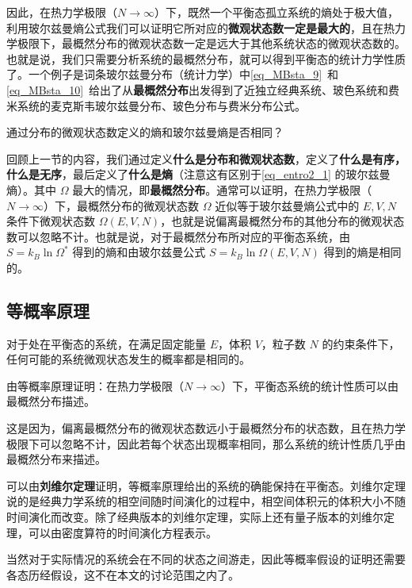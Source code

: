 因此，在热力学极限（$N\rightarrow \infty$）下，既然一个平衡态孤立系统的熵处于极大值，利用玻尔兹曼熵公式我们可以证明它所对应的\textbf{微观状态数一定是最大的}，且在热力学极限下，最概然分布的微观状态数一定是远大于其他系统状态的微观状态数的。也就是说，我们只需要分析系统的最概然分布，就可以得到平衡态的统计力学性质了。一个例子是词条玻尔兹曼分布（统计力学）中\autoref{eq_MBsta_9}~和\autoref{eq_MBsta_10}~给出了从\textbf{最概然分布}出发得到了近独立经典系统、玻色系统和费米系统的麦克斯韦玻尔兹曼分布、玻色分布与费米分布公式。
\begin{exercise}{}
通过分布的微观状态数定义的熵和玻尔兹曼熵是否相同？
\end{exercise}
回顾上一节的内容，我们通过定义\textbf{什么是分布和微观状态数}，定义了\textbf{什么是有序，什么是无序}，最后定义了\textbf{什么是熵}（注意这有区别于\autoref{eq_entro2_1} 的玻尔兹曼熵）。其中 $\Omega$ 最大的情况，即\textbf{最概然分布}。通常可以证明，在热力学极限（$N\rightarrow \infty$）下，最概然分布的微观状态数 $\Omega$ 近似等于玻尔兹曼熵公式中的 $E,V,N$ 条件下微观状态数 $\Omega(E,V,N)$，也就是说偏离最概然分布的其他分布的微观状态数可以忽略不计。也就是说，对于最概然分布所对应的平衡态系统，由 $S=k_B\ln \Omega^*$ 得到的熵和由玻尔兹曼公式 $S=k_B\ln \Omega(E,V,N)$ 得到的熵是相同的。

\subsection{等概率原理}
对于处在平衡态的系统，在满足固定能量 $E$，体积 $V$，粒子数 $N$ 的约束条件下，任何可能的系统微观状态发生的概率都是相同的。
\begin{exercise}{}
由等概率原理证明：在热力学极限（$N\rightarrow \infty$）下，平衡态系统的统计性质可以由最概然分布描述。
\end{exercise}
这是因为，偏离最概然分布的微观状态数远小于最概然分布的状态数，且在热力学极限下可以忽略不计，因此若每个状态出现概率相同，那么系统的统计性质几乎由最概然分布来描述。

可以由\textbf{刘维尔定理}证明，等概率原理给出的系统的确能保持在平衡态。刘维尔定理说的是经典力学系统的相空间随时间演化的过程中，相空间体积元的体积大小不随时间演化而改变。除了经典版本的刘维尔定理，实际上还有量子版本的刘维尔定理，可以由密度算符的时间演化方程表示。

当然对于实际情况的系统会在不同的状态之间游走，因此等概率假设的证明还需要各态历经假设，这不在本文的讨论范围之内了。